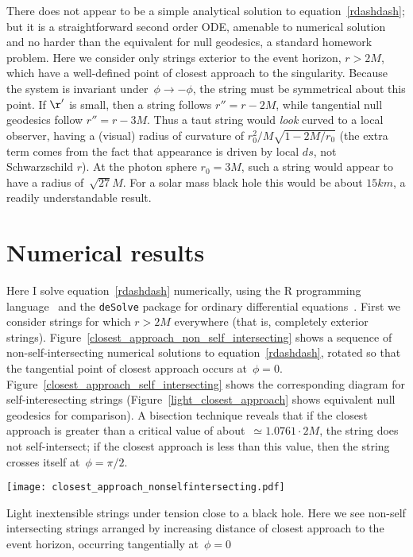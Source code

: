 \documentclass{ws-tpe}
\begin{document}
There does not appear to be a simple analytical solution to
equation~\ref{rdashdash}; but it is a straightforward second order
ODE, amenable to numerical solution and no harder than the equivalent
for null geodesics, a standard homework problem.  Here we consider
only strings exterior to the event horizon, $r>2M$, which have a
well-defined point of closest approach to the singularity.  Because
the system is invariant under~$\phi\longrightarrow-\phi$, the string
must be symmetrical about this point.  If $\r'$ is small, then a
string follows $r''=r-2M$, while tangential null geodesics follow
$r''=r-3M$.  Thus a taut string would {\em look} curved to a local
observer, having a (visual) radius of curvature of
$r_0^2/M\sqrt{1-2M/r_0}$ (the extra term comes from the fact that
appearance is driven by local $ds$, not Schwarzschild $r$).  At the
photon sphere $r_0=3M$, such a string would appear to have a radius
of~$\sqrt{27}M$.  For a solar mass black hole this would be about
$15\unit{km}$, a readily understandable result.


\section{Numerical results}

Here I solve equation~\ref{rdashdash} numerically, using the R
programming language~\cite{rcore2019} and the \verb+deSolve+ package
for ordinary differential equations~\cite{soetart2010}.  First we
consider strings for which $r>2M$ everywhere (that is, completely
exterior strings).
Figure~\ref{closest_approach_non_self_intersecting} shows a sequence
of non-self-intersecting numerical solutions to
equation~\ref{rdashdash}, rotated so that the tangential point of
closest approach occurs at~$\phi=0$.
Figure~\ref{closest_approach_self_intersecting} shows the
corresponding diagram for self-interesecting strings
(Figure~\ref{light_closest_approach} shows equivalent null geodesics
for comparison).  A bisection technique reveals that if the closest
approach is greater than a critical value of about~$\simeq 1.0761\cdot
2M$, the string does not self-intersect; if the closest approach is
less than this value, then the string crosses itself at~$\phi=\pi/2$.

\begin{figurehere} %
  \centerline{
    \texttt{[image: closest\_approach\_nonselfintersecting.pdf]}
  }
  \caption{Light inextensible strings under tension close to a black
    hole.  Here we see non-self intersecting strings arranged by
    increasing distance of closest approach to the event horizon,
    occurring tangentially at~$\phi=0$}
  \label{closest_approach_non_self_intersecting}
\end{figurehere}
\end{document}
